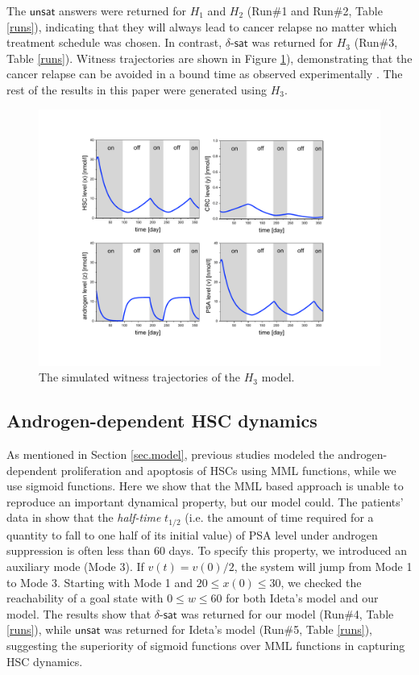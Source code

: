 The $\mathsf{unsat}$ answers were returned for $H_1$ and $H_2$ (Run\#1 and Run\#2, Table \ref{runs}), indicating that they will always lead to cancer relapse no matter which 
treatment schedule 
was chosen. In contrast, $\delta$-$\mathsf{sat}$ was returned for $H_3$ (Run\#3, Table \ref{runs}). Witness trajectories are shown in Figure \ref{prostate-fig1}), demonstrating that the cancer relapse can be avoided in a bound time as observed experimentally \cite{ bruchovsky06,bruchovsky07}. The rest of the results in this paper were generated using $H_3$.

\begin{figure}[htb]
\centering
\includegraphics[scale=0.48]{fig-witness}
\caption{The simulated witness trajectories of the $H_3$ model.}
\label{prostate-fig1}
\end{figure}

\subsection{Androgen-dependent HSC dynamics}

As mentioned in Section \ref{sec.model}, previous studies \cite{jackson04a,jackson04b,ideta08} modeled the androgen-dependent proliferation and apoptosis of HSCs using MML functions, while we use sigmoid functions. Here we show that the MML based approach is unable to reproduce an important dynamical property, but our model could. The patients' data in \cite{ bruchovsky06,bruchovsky07} show that the \textit{half-time} $t_{1/2}$ (i.e. the amount of time required for a quantity to fall to one half of its initial value) of PSA level under androgen suppression is often less than $60$ days. To specify this property, we introduced an auxiliary mode (Mode 3). If $v(t)=v(0)/2$, the system will jump from Mode 1 to Mode 3. Starting with Mode 1 and $20 \le x(0) \le 30$, we checked the reachability of a goal state with $0 \le w \le 60$ for both Ideta's model \cite{ideta08} and our model. The results show that  $\delta$-$\mathsf{sat}$ was returned for our model (Run\#4, Table \ref{runs}), while $\mathsf{unsat}$ was returned for Ideta's model (Run\#5, Table \ref{runs}), suggesting the superiority of sigmoid functions over MML functions in capturing HSC dynamics.


